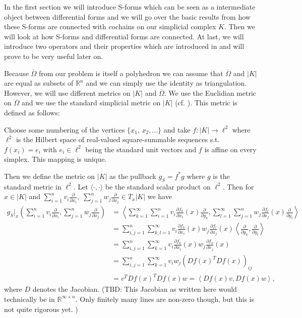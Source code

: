 \documentclass[12pt,a4paper]{article}
\numberwithin{equation}{subsection}
\numberwithin{lemma}{subsection}
\theoremstyle{definition}
\newcommand{\omegabar}{\overline{\Omega}}
\newcommand{\real}{\mathbb{R}}
\begin{document}
In the first section we will introduce S-forms which can be seen as a
intermediate object between differential forms and we will go over the 
basic results from \cite{goldshtein} how these S-forms are connected with 
cochains on our simplicial complex $K$. Then we will look at how S-forms 
and differential forms are connected. At last, we will introduce two  
operators and their properties which are introduced in \cite{goldshtein}
and will prove to be very useful later on.

Because $\omegabar$ from our problem is itself a polyhedron we can
assume that $\omegabar$ and $|K|$ are equal as subsets of $\real^n$ and we can
simply use the identity as triangulation.
However, we will use different metrics on $|K|$ and $\omegabar$. 
We use the Euclidian metric on 
$\omegabar$ and we use the standard simplicial metric on $|K|$ (cf. 
\cite[p.191]{goldshtein}). This metric is defined as follows:

Choose some numbering of the vertices $\{ x_1,\, x_2, ... \}$ and
take $f: |K| \rightarrow \ell^2$ where $\ell^2$ is the 
Hilbert space of real-valued square-summable sequences s.t. $f(x_i) = e_i$ 
with $e_i \in \ell^2$ being the standard unit vectors and $f$ is affine on 
every simplex. This mapping is unique.%

Then we define the metric on $|K|$ as the pullback $g_S = f^*g$ 
where $g$ is the standard metric in $\ell^2$. Let $\langle \cdot , 
\cdot \rangle$ be the standard scalar product on $\ell^2$. Then for $x \in |K|$ 
and $\sum_{i=1}^n v_i \frac{\partial}{\partial x_i}, \; 
\sum_{j=1}^n w_j \frac{\partial}{\partial x_j} \in T_x |K|$ we have 
\begin{align*}
g_S|_x\left(\sum_{i=1}^n v_i \frac{\partial}{\partial x_i}, 
\sum_{j=1}^n w_j \frac{\partial}{\partial x_j}\right) &= 
\left\langle \sum_{k=1}^\infty \sum_{i=1}^n v_i 
\frac{\partial f_k}{\partial x_i} (x)
\frac{\partial }{\partial y_k}, 
\sum_{l=1}^\infty \sum_{j=1}^n w_j \frac{\partial f_l}{\partial x_j} (x)
\frac{\partial }{\partial y_l} \right\rangle \\   
&= \sum_{i,j=1}^n \sum_{k,l=1}^\infty v_i \frac{\partial f_k}{\partial x_i} (x)
w_j \frac{\partial f_l}{\partial x_j} (x) 
\left\langle \frac{\partial }{\partial y_k}, \frac{\partial }{\partial y_l} 
\right\rangle\\
&= \sum_{i,j=1}^n \sum_{k=1}^\infty v_i \frac{\partial f_k}{\partial x_i} (x)
w_j \frac{\partial f_k}{\partial x_j} (x)\\
&= \sum_{i,j=1}^n \sum_{k=1}^\infty v_i w_j \left( Df(x)^T Df(x) \right)_{ij} \\
&= v^T Df(x)^T Df(x) w = \left\langle Df(x) v, Df(x) w \right\rangle,
\end{align*}
where $D$ denotes the Jacobian. 
{\color{red} (TBD: This Jacobian as written here would technically be in 
$\real^{\infty \times n}$. Only finitely many lines are non-zero though, 
but this is not quite rigorous yet. )}
\end{document}
